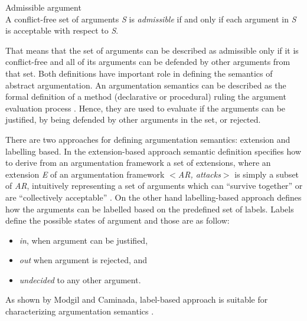 \begin{definition}{Admissible argument} \label{admissibleArgument}
\label{AdmissibleArgDef}\\
A conflict-free set of arguments \textit{S} is \textit{admissible} if and only if each argument in \textit{S} is acceptable with respect to \textit{S}.
\end{definition}

That means that the set of arguments can be described as admissible only if it is conflict-free and all of its arguments can be defended by other arguments from that set. Both definitions have important role in defining the semantics of abstract argumentation. An argumentation semantics can be described as the formal definition of a method (declarative or procedural) ruling the argument evaluation process \citep{baroni2009semantics}. Hence, they are used to evaluate if the arguments can be justified, by being defended by other arguments in the set, or rejected. 

There are two approaches for defining argumentation semantics: extension and labelling based. In the extension-based approach semantic definition specifies how to derive from an argumentation framework a set of extensions, where an extension \textit{E} of an argumentation framework $<$\textit{AR, attacks}$>$ is simply a subset of \textit{AR}, intuitively representing a set of arguments which can “survive together” or are “collectively acceptable” \citep{baroni2009semantics}. On the other hand labelling-based approach defines how the arguments can be labelled based on the predefined set of labels. Labels define the possible states of argument and those are as follow: 
\begin{itemize}
	\item \textit{in}, when argument can be justified, 
	\item \textit{out} when argument is rejected, and 
	\item \textit{undecided} to any other argument.
\end{itemize}

As shown by Modgil and Caminada, label-based approach is suitable for characterizing argumentation semantics \citep{modgil2009proof}.